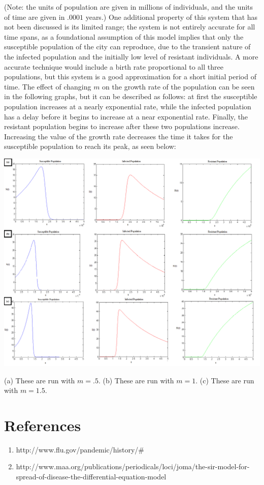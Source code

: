 \documentclass{article}
\begin{document}
(Note: the units of population are given in millions of individuals, and the units of time are given in $.0001$ years.) One additional property of this system that has not been discussed is its limited range; the system is not entirely accurate for all time spans, as a foundational assumption of this model implies that only the susceptible population of the city can reproduce, due to the transient nature of the infected population and the initially low level of resistant individuals. A more accurate technique would include a birth rate proportional to all three populations, but this system is a good approximation for a short initial period of time. The effect of changing $m$ on the growth rate of the population can be seen in the following graphs, but it can be described as follows: at first the susceptible population increases at a nearly exponential rate, while the infected population has a delay before it begins to increase at a near exponential rate. Finally, the resistant population begins to increase after these two populations increase. Increasing the value of the growth rate decreases the time it takes for the susceptible population to reach its peak, as seen below:
\begin{center}
\includegraphics[keepaspectratio,width=15cm]{alltogether.png}
\caption{(a) These are run with $m=.5$. (b) These are run with $m=1$. (c) These are run with $m=1.5$.}
\end{center}

\section*{References}
\begin{enumerate}[1]
    \item http://www.flu.gov/pandemic/history/\#
    \item http://www.maa.org/publications/periodicals/loci/joma/the-sir-model-for-spread-of-disease-the-differential-equation-model
\end{enumerate}
\end{document}
